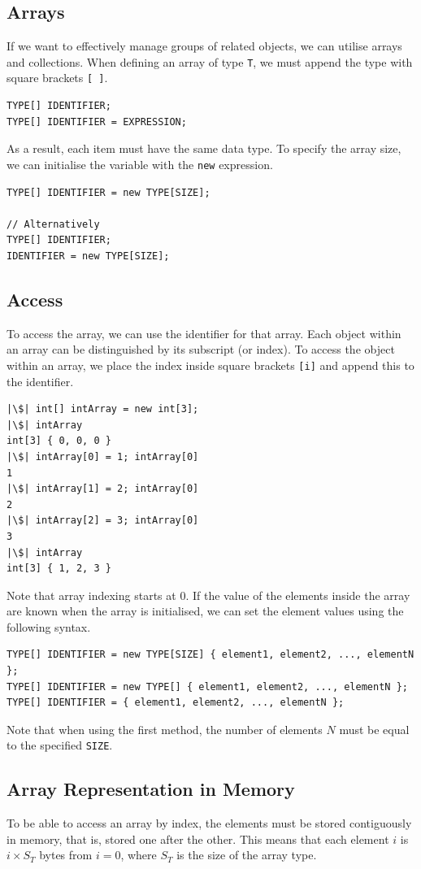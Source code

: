 \documentclass{article}
\begin{document}
\subsection{Arrays}
If we want to effectively manage groups of related objects, we can
utilise arrays and collections. When defining an array of type
\texttt{T}, we must append the type with square brackets
\texttt{[ ]}.
\begin{verbatim}
TYPE[] IDENTIFIER;
TYPE[] IDENTIFIER = EXPRESSION;
\end{verbatim}
As a result, each item must have the same data type. To specify the
array size, we can initialise the variable with the
\texttt{new} expression.
\begin{verbatim}
TYPE[] IDENTIFIER = new TYPE[SIZE];

// Alternatively
TYPE[] IDENTIFIER;
IDENTIFIER = new TYPE[SIZE];
\end{verbatim}
\subsection{Access}
To access the array, we can use the identifier for that array. Each
object within an array can be distinguished by its subscript (or
index). To access the object within an array, we place the index inside
square brackets \texttt{[i]} and append this to the
identifier.
\begin{verbatim}
|\$| int[] intArray = new int[3];
|\$| intArray
int[3] { 0, 0, 0 }
|\$| intArray[0] = 1; intArray[0]
1
|\$| intArray[1] = 2; intArray[0]
2
|\$| intArray[2] = 3; intArray[0]
3
|\$| intArray
int[3] { 1, 2, 3 }
\end{verbatim}
Note that array indexing starts at 0. If the value of the elements
inside the array are known when the array is initialised, we can set
the element values using the following syntax.
\begin{verbatim}
TYPE[] IDENTIFIER = new TYPE[SIZE] { element1, element2, ..., elementN };
TYPE[] IDENTIFIER = new TYPE[] { element1, element2, ..., elementN };
TYPE[] IDENTIFIER = { element1, element2, ..., elementN };
\end{verbatim}
Note that when using the first method, the number of elements \(N\)
must be equal to the specified \texttt{SIZE}. %
\subsection{Array Representation in Memory}
To be able to access an array by index, the elements must be stored
contiguously in memory, that is, stored one after the other. This means
that each element \(i\) is \(i \times S_T\) bytes from \(i = 0\), where
\(S_T\) is the size of the array type.
\end{document}
